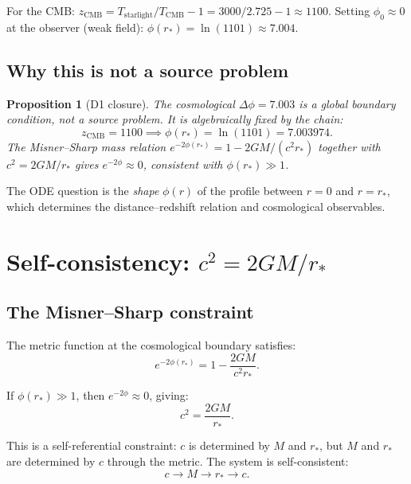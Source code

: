 \documentclass[11pt,letterpaper]{article}
\newtheorem{proposition}[theorem]{Proposition}
\numberwithin{equation}{section}
\begin{document}
For the CMB: $z_\mathrm{CMB} = T_\mathrm{starlight}/T_\mathrm{CMB} - 1
= 3000/2.725 - 1 \approx 1100$. Setting $\phi_0 \approx 0$ at the observer
(weak field): $\phi(r_*) = \ln(1101) \approx 7.004$.

\subsection{Why this is not a source problem}

\begin{proposition}[D1 closure]
\label{prop:D1}
The cosmological $\Delta\phi = 7.003$ is a \emph{global boundary condition},
not a source problem. It is algebraically fixed by the chain:
\begin{equation}
  z_\mathrm{CMB} = 1100 \implies \phi(r_*) = \ln(1101) = 7.003974.
\end{equation}
The Misner--Sharp mass relation $e^{-2\phi(r_*)} = 1 - 2GM/(c^2 r_*)$
together with $c^2 = 2GM/r_*$ gives $e^{-2\phi} \approx 0$, consistent
with $\phi(r_*) \gg 1$.
\end{proposition}

The ODE question is the \emph{shape} $\phi(r)$ of the profile between
$r = 0$ and $r = r_*$, which determines the distance--redshift relation
and cosmological observables.

\section{Self-consistency: $c^2 = 2GM/r_*$}
\label{sec:self_consistency}

\subsection{The Misner--Sharp constraint}

The metric function at the cosmological boundary satisfies:
\begin{equation}
\label{eq:misner_sharp}
  e^{-2\phi(r_*)} = 1 - \frac{2GM}{c^2 r_*}.
\end{equation}

If $\phi(r_*) \gg 1$, then $e^{-2\phi} \approx 0$, giving:
\begin{equation}
\label{eq:c2_2GM}
  c^2 = \frac{2GM}{r_*}.
\end{equation}

This is a self-referential constraint: $c$ is determined by $M$ and $r_*$,
but $M$ and $r_*$ are determined by $c$ through the metric. The system
is self-consistent:
\begin{equation}
  c \to M \to r_* \to c.
\end{equation}
\end{document}
